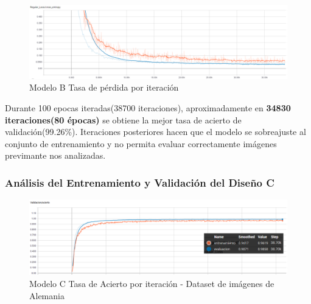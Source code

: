 			
			\begin{figure}[H]
				\begin{center}
				\includegraphics[width=1\textwidth]{images/desarrollo/trainResults/german/model1Loss} 
				\end{center}
				\begin{center}
				\caption{\small{Modelo B Tasa de pérdida por iteración}}
				
				{\small{\fontsize{10}{16.8}\selectfont {Fuente: Elaboración propia}}}
				\end{center}
				\vspace{-1.5em}
			\end{figure}

			Durante 100 epocas iteradas(38700 iteraciones), aproximadamente en  \textbf{34830 iteraciones(80 épocas)} se obtiene la mejor tasa de acierto de validación(99.26\%). Iteraciones posteriores hacen que el modelo se sobreajuste al conjunto de entrenamiento y no permita evaluar correctamente imágenes previmante nos analizadas.



		\subsubsection{Análisis del Entrenamiento y Validación del Diseño C} 

			\begin{figure}[H]
				\begin{center}
				\includegraphics[width=1\textwidth]{images/desarrollo/trainResults/german/model4Acierto} 
				\end{center}
				\begin{center}
				\caption{\small{Modelo C Tasa de Acierto por iteración - Dataset de imágenes de Alemania  }}
				
				{\small{\fontsize{10}{16.8}\selectfont {Fuente: Elaboración propia}}}
				\end{center}
				\vspace{-1.5em}
			\end{figure}
			

